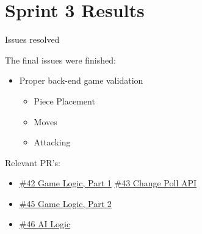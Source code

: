 \documentclass[allowframebreaks]{beamer}
\begin{document}
\section{Sprint 3 Results}
\label{sec:org24986a8}
\begin{frame}[label={sec:orga5fc01f}]{Issues resolved}
\begin{block}{The final issues were finished:}
\begin{itemize}
\item Proper back-end game validation
\begin{itemize}
\item Piece Placement
\item Moves
\item Attacking
\end{itemize}
\end{itemize}
\end{block}
\begin{block}{Relevant PR's:}
\begin{itemize}
\item \href{https://github.com/amadeusine/CS449GroupProject/pull/42}{\#42 Game Logic, Part 1}
\href{https://github.com/amadeusine/CS449GroupProject/issues/43}{\#43 Change Poll API}
\item \href{https://github.com/amadeusine/CS449GroupProject/pull/45}{\#45 Game Logic, Part 2}
\item \href{https://github.com/amadeusine/CS449GroupProject/pull/46}{\#46 AI Logic}
\end{itemize}
\end{block}
\end{frame}
\end{document}
